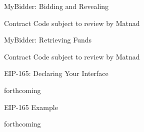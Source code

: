 \documentclass[handout]{beamer}
\begin{document}
\begin{frame}{MyBidder: Bidding and Revealing}

Contract Code subject to review by Matnad

\end{frame}

\begin{frame}{MyBidder: Retrieving Funds}

Contract Code subject to review by Matnad

\end{frame}

\begin{frame}{EIP-165: Declaring Your Interface}

forthcoming

\end{frame}

\begin{frame}{EIP-165 Example}

forthcoming

\end{frame}
\end{document}
